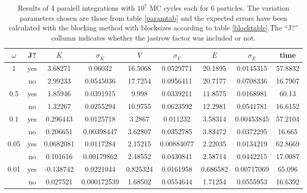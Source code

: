 \documentclass[a4paper,English,10pt]{article}
\renewcommand{\bar}{\overline}
\begin{document}
\begin{table}
  \centering
  \caption[Results 6 particles]{Results of 4 paralell integrations with $10^7$ MC cycles each for 6 particles.
    The variation parameters chosen are those from table \ref{paramtab} and the expected errors have been calculated with the blocking method with blocksizes
    according to table \ref{blocktable}.The ``J?'' collumn indicates whether the jastrow factor was included or not.} 
  \label{Etab6}
  \begin{tabular}{*{9}c}
    \toprule
    $\omega$ &J?& $\bar{K}$ & $\sigma_{\bar{K}}$& $\bar{V}$& $\sigma_{\bar{V}}$& $\bar{E}$  & $\sigma_{\bar{E}}$  &time\\
    \midrule
    1 &yes&3.68271	&0.06032	&16.5068	&0.0529771	&20.1895	&0.0145315&57.8832\\
    &no &2.99233	&0.0545036	&17.7254	&0.0956411	&20.7177	&0.0708336 &16.7907\\
    0.5 &yes&1.85946	&0.0391915	&9.998	&0.0339211	&11.8575	&0.0168981 & 60.13\\
    &no &1.32267	&0.0255294	&10.9755	&0.0623592	&12.2981	&0.0541781 &16.6152\\
    0.1&yes &0.296443	&0.0125718	&3.2867	&0.011232	&3.58314	&0.00453845 &57.2104\\
    & no & 0.206651	&0.00398447	&3.62807	&0.0352785	&3.83472	&0.0372295 &16.665\\
    0.05&yes &0.0682081	&0.0117284	&2.15215	&0.00884077	&2.22035	&0.0134219&62.8669\\
    &no&0.101616	&0.00179862	&2.48552	&0.0430841	&2.58714	&0.0442215 &17.0087\\
    0.01&yes &-0.138742	&0.0221044	&0.825324	&0.0161958	&0.686582	&0.00717069 &65.096\\
    &no&0.027521	&0.000172539	&1.68502	&0.0554644	&1.71254	&0.0555953  &16.6392\\
    
    \bottomrule
  \end{tabular}
\end{table}
\end{document}
